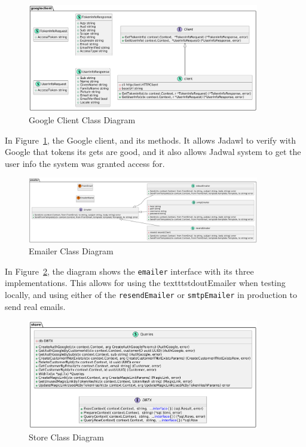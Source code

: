 \begin{figure}[!h]
    \centering
    \includegraphics[width=0.9\textwidth]{images/docs/diagrams/class/class-diagram/googleclient.png}
    \caption{Google Client Class Diagram}
    \label{fig:googleclient-class-diagram}
\end{figure}

In Figure~\ref{fig:googleclient-class-diagram}, the Google client, and its methods.
It allows Jadawl to verify with Google that tokens its gets are good, and it also allows Jadwal system to get the user info the system was granted access for.



\begin{figure}[!h]
    \centering
    \includegraphics[width=0.9\textwidth]{images/docs/diagrams/class/class-diagram/emailer.png}
    \caption{Emailer Class Diagram}
    \label{fig:emailer-class-diagram}
\end{figure}

In Figure~\ref{fig:emailer-class-diagram}, the diagram shows the \texttt{emailer} interface with its three implementations. This allows for using the texttt{stdoutEmailer} when testing locally, and using either of the \texttt{resendEmailer} or \texttt{smtpEmailer} in production to send real emails.



\begin{figure}[!h]
    \centering
    \includegraphics[width=0.9\textwidth]{images/docs/diagrams/class/class-diagram/store.png}
    \caption{Store Class Diagram}
    \label{fig:store-class-diagram}
\end{figure}

